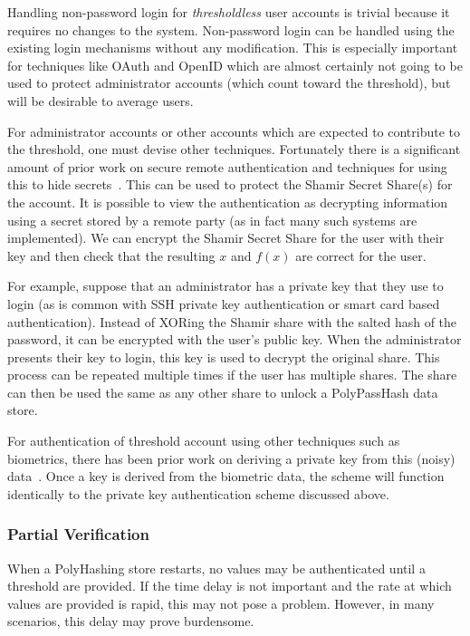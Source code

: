 Handling non-password login for \emph{thresholdless} user accounts is trivial 
because
it requires no changes to the system.   Non-password login can be handled 
using the existing login mechanisms without any modification.
This is especially important for techniques like OAuth and OpenID which 
are almost certainly not going to be used to protect administrator accounts
(which count toward the threshold), but will be desirable to average users.

For administrator accounts or other accounts which are expected to contribute
to the threshold, one must devise other techniques.   Fortunately there is
a significant amount of prior work on secure remote authentication and
techniques for using this to hide 
secrets~\cite{deo1998authentication, yang1999password}.   This can be used to 
protect the Shamir Secret Share(s) for the account.
It is possible to view the authentication as decrypting information using a 
secret stored by a remote party (as in fact many such systems are implemented).
We can encrypt the Shamir Secret Share for the user with their key and then
check that the resulting $x$ and $f(x)$ are correct for the user.   

For example, suppose that an administrator has a private key that they use
to login (as is common with SSH private key authentication or smart card
based authentication).   Instead of
XORing the Shamir share with the salted hash of the password, it can
be encrypted with the user's public key.   When the administrator presents
their key to login, this key is used to decrypt the original share.   This
process can be repeated multiple times if the user has multiple shares.
 The share can then be used the same as any other share to 
unlock a PolyPassHash data store.


For authentication of threshold account using other techniques such as 
biometrics, there has been prior work on deriving a private key from this 
(noisy) data~\cite{juels2006fuzzy}.   Once a key is derived from the biometric 
data, the scheme will function identically to the private key authentication 
scheme discussed above.




\subsubsection{Partial Verification}
\label{sec-partial}

When a PolyHashing store restarts, no values may be authenticated until a
threshold are provided.   If the time delay is not important and the rate
at which values are provided is rapid, this may not pose a problem.   However,
in many scenarios, this delay may prove burdensome.

